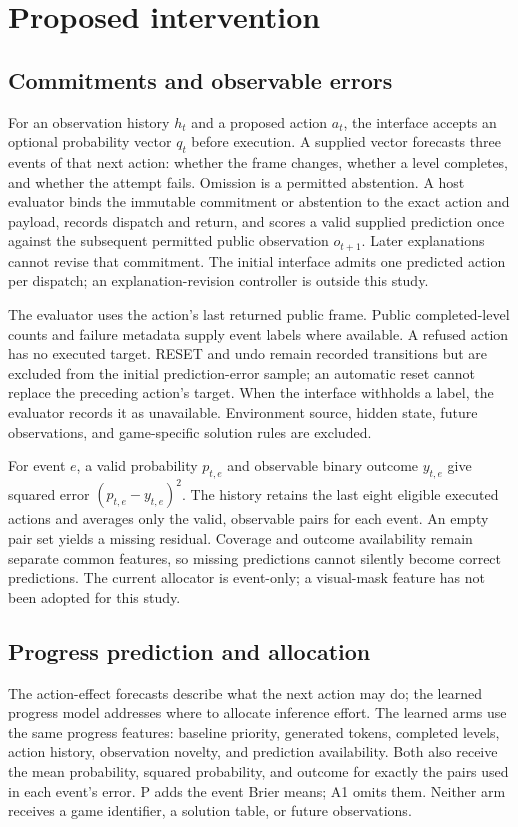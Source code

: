 \documentclass[11pt]{article}
\begin{document}
\section{Proposed intervention}
\subsection{Commitments and observable errors}
For an observation history $h_t$ and a proposed action $a_t$, the interface accepts an optional probability vector $q_t$ before execution. A supplied vector forecasts three events of that next action: whether the frame changes, whether a level completes, and whether the attempt fails. Omission is a permitted abstention. A host evaluator binds the immutable commitment or abstention to the exact action and payload, records dispatch and return, and scores a valid supplied prediction once against the subsequent permitted public observation $o_{t+1}$. Later explanations cannot revise that commitment. The initial interface admits one predicted action per dispatch; an explanation-revision controller is outside this study.

The evaluator uses the action's last returned public frame. Public completed-level counts and failure metadata supply event labels where available. A refused action has no executed target. RESET and undo remain recorded transitions but are excluded from the initial prediction-error sample; an automatic reset cannot replace the preceding action's target. When the interface withholds a label, the evaluator records it as unavailable. Environment source, hidden state, future observations, and game-specific solution rules are excluded.

For event $e$, a valid probability $p_{t,e}$ and observable binary outcome $y_{t,e}$ give squared error $(p_{t,e}-y_{t,e})^2$. The history retains the last eight eligible executed actions and averages only the valid, observable pairs for each event. An empty pair set yields a missing residual. Coverage and outcome availability remain separate common features, so missing predictions cannot silently become correct predictions. The current allocator is event-only; a visual-mask feature has not been adopted for this study.

\subsection{Progress prediction and allocation}
The action-effect forecasts describe what the next action may do; the learned progress model addresses where to allocate inference effort. The learned arms use the same progress features: baseline priority, generated tokens, completed levels, action history, observation novelty, and prediction availability. Both also receive the mean probability, squared probability, and outcome for exactly the pairs used in each event's error. P adds the event Brier means; A1 omits them. Neither arm receives a game identifier, a solution table, or future observations.
\end{document}
